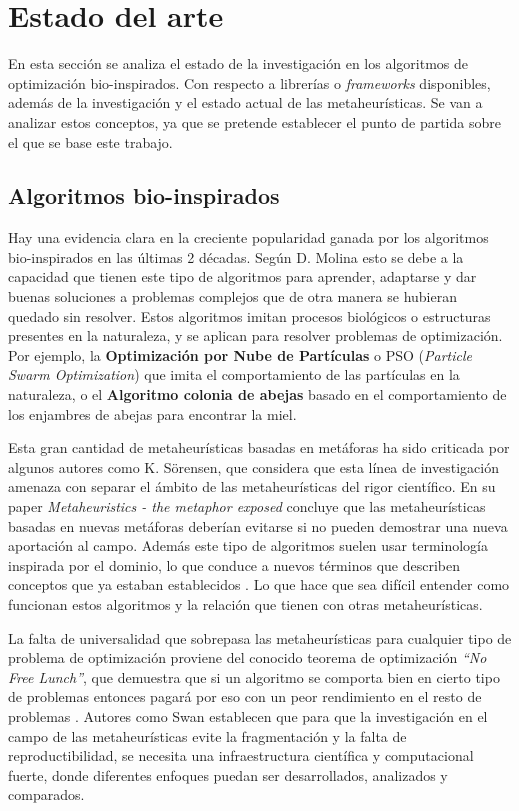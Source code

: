 \chapter{Estado del arte}

En esta sección se analiza el estado de la investigación en los algoritmos de optimización bio-inspirados. Con respecto a 
librerías o \emph{frameworks} disponibles, además de la investigación y el estado actual de las metaheurísticas. Se van a analizar
estos conceptos, ya que se pretende establecer el punto de partida sobre el que se base este trabajo.

\section{Algoritmos bio-inspirados}

Hay una evidencia clara en la creciente popularidad ganada por los algoritmos bio-inspirados en las últimas 2 décadas. Según D. Molina \cite{Molina2020ComprehensiveTO} esto se
debe a la capacidad que tienen este tipo de algoritmos para aprender, adaptarse y dar buenas soluciones a problemas complejos que de otra manera se hubieran quedado sin
resolver. Estos algoritmos imitan procesos biológicos o estructuras presentes en la naturaleza, y se aplican para resolver problemas de optimización. Por ejemplo, 
la \textbf{Optimización por Nube de Partículas} o PSO (\textit{Particle Swarm Optimization}) que imita el comportamiento de las partículas en la naturaleza, o 
el \textbf{Algoritmo colonia de abejas} basado en el comportamiento de los enjambres de abejas para encontrar la miel. 

Esta gran cantidad de metaheurísticas basadas en metáforas ha sido criticada por algunos autores como K. Sörensen\cite{metaphor_exposed}, 
que considera que esta línea de investigación amenaza con separar el ámbito de las metaheurísticas del rigor científico. 
En su paper \emph{Metaheuristics - the metaphor exposed} concluye que las metaheurísticas basadas en nuevas metáforas deberían 
evitarse si no pueden demostrar una nueva aportación al campo. Además este tipo de algoritmos suelen usar terminología inspirada por el dominio, 
lo que conduce a nuevos términos que describen conceptos que ya estaban establecidos \cite{mitigating_metaphors}. Lo que hace que sea difícil 
entender como funcionan estos algoritmos y la relación que tienen con otras metaheurísticas. 

La falta de universalidad que sobrepasa las metaheurísticas para cualquier tipo de problema de optimización proviene
del conocido teorema de optimización \emph{``No Free Lunch''}, que demuestra que si un algoritmo se comporta bien en cierto tipo de 
problemas entonces pagará por eso con un peor rendimiento en el resto de problemas \cite{585893}. Autores como 
Swan \cite{metaheuristics} establecen que para que la investigación en el campo de las metaheurísticas evite la fragmentación y la falta de reproductibilidad, se 
necesita una infraestructura científica y computacional fuerte, donde diferentes enfoques puedan ser desarrollados, analizados y comparados. 

